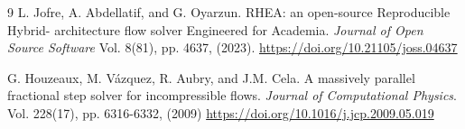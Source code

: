 \documentclass{article}
\begin{document}
\begin{thebibliography}{9}
 L. Jofre, A. Abdellatif, and G. Oyarzun. RHEA: an open-source Reproducible Hybrid-
architecture flow solver Engineered for Academia. {\it Journal of Open Source Software} Vol. 8(81), pp. 4637, (2023). \href{https://doi.org/10.21105/joss.04637}{https://doi.org/10.21105/joss.04637}

 G. Houzeaux, M. Vázquez, R. Aubry, and J.M. Cela. A massively parallel fractional step solver for incompressible flows. {\it Journal of Computational Physics}. Vol. 228(17), pp. 6316-6332, (2009) \href{https://doi.org/10.1016/j.jcp.2009.05.019}{https://doi.org/10.1016/j.jcp.2009.05.019}









\end{thebibliography}
\end{document}
